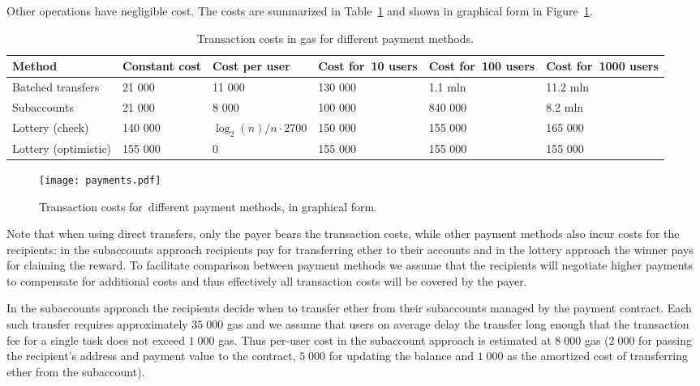 \documentclass[a4paper]{article}
\begin{document}
    Other operations have negligible cost. The costs are summarized in Table~\ref{table:costs}
    and shown in graphical form in Figure~\ref{fig:costs}.
    \begin{table}
      \begin{tabular}{p{9em}p{4em}p{7em}p{6em}p{6em}p{6em}}
        \hline
        Method & Constant cost & Cost per user& Cost for~10 users & Cost for~100 users & Cost for~1000 users \\ \hline
        Batched transfers   & 21 000  & 11 000 & 130 000 & 1.1 mln & 11.2 mln \\ %
        Subaccounts         & 21 000  &  8 000 & 100 000 & 840 000 &  8.2 mln \\ %
        Lottery (check)     & 140 000 & $\log_2(n)/n \cdot 2700 $ & 150 000 & 155 000 & 165 000 \\ %
        Lottery (optimistic)& 155 000 & 0 & 155 000 & 155 000 & 155 000 \\ \hline
      \end{tabular}
      \caption{Transaction costs in gas for different payment methods.}
      \label{table:costs}
    \end{table}
    \begin{figure}
      \centering
      \texttt{[image: payments.pdf]}
      \caption{Transaction costs for~different payment methods, in graphical form.}
      \label{fig:costs}
    \end{figure}

    Note that when using direct transfers, only the payer bears the
    transaction costs, while other payment methods also incur costs
    for the recipients: in the subaccounts approach recipients pay for
    transferring ether to their accounts and in the lottery approach
    the winner pays for claiming the reward. To facilitate comparison
    between payment methods we assume that the recipients will
    negotiate higher payments to compensate for additional costs and
    thus effectively all transaction costs will be covered by the payer.

    In the subaccounts approach the recipients decide when to transfer
    ether from their subaccounts managed by the payment contract. Each
    such transfer requires approximately $35\;000$ gas and we assume that
    users on average delay the transfer long enough that the transaction
    fee for a single task does not exceed $1\;000$ gas. Thus per-user cost
    in the subaccount approach is estimated at $8\;000$ gas ($2\;000$ for passing
    the recipient's address and payment value to the contract, $5\;000$ for
    updating the balance and $1\;000$ as the amortized cost of transferring ether
    from the subaccount).
\end{document}

